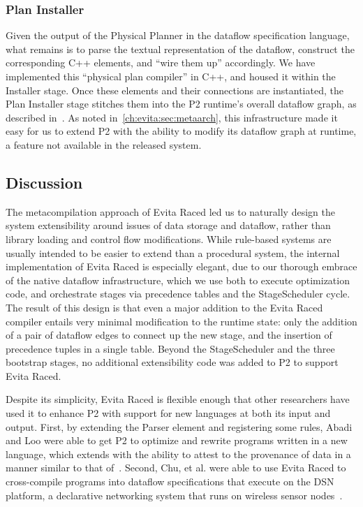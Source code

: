 \subsubsection{Plan Installer}
\label{ch:evita:sec:installer}

Given the output of the Physical Planner in the dataflow specification
language, what remains is to parse the
textual representation of the dataflow,  construct the
corresponding C++ elements, and ``wire them up'' accordingly. We have
implemented this 
``physical plan compiler'' in C++, and housed it within the
Installer stage.  Once these elements and their connections are
instantiated, the Plan Installer stage stitches them into the P2
runtime's overall dataflow graph, as described in~\cite{p2:sosp}.
As noted in~\ref{ch:evita:sec:metaarch}, this infrastructure made it easy for us to extend P2 with the ability to modify its dataflow graph at runtime,
a feature not available in the released system. 
% 


\subsection{Discussion}

The metacompilation approach of Evita Raced led us to naturally design the
system extensibility around issues of data storage and dataflow, rather than
library loading and control flow modifications.  While rule-based systems are
usually intended to be easier to extend than a procedural system, the internal
implementation of Evita Raced is especially elegant, due to our thorough
embrace of the native dataflow infrastructure, which we use both to execute
optimization code, and orchestrate stages via precedence tables and the
StageScheduler cycle.  The result of this design is that even a major addition
to the Evita Raced compiler entails very minimal modification to the runtime
state: only the addition of a pair of dataflow edges to connect up the new
stage, and the insertion of precedence tuples in a single table.  Beyond the
StageScheduler and the three bootstrap stages, no additional extensibility code
was added to P2 to support Evita Raced.

Despite its simplicity, Evita Raced is flexible enough that other researchers
have used it to enhance P2 with support for new languages at both its input and
output.  First, by extending the Parser element and registering some \OVERLOG
rules, Abadi and Loo were able to get P2 to optimize and rewrite programs
written in a new language, which extends \OVERLOG with the ability to attest to
the provenance of data in a manner similar to that of~\cite{abadi-netdb07}.
Second, Chu, et al. were able to use Evita Raced to cross-compile \OVERLOG programs
into dataflow specifications that execute on the DSN platform, a declarative
networking system that runs on wireless sensor nodes~\cite{chu-sensys07}.


